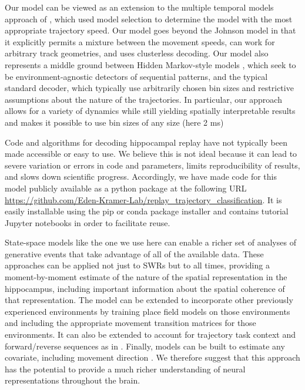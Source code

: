 \documentclass[9pt,lineno]{elife}
\begin{document}
Our model can be viewed as an extension to the multiple temporal models approach of \cite{JohnsonMeasuringdistributedproperties2008}, which used model selection to determine the model with the most appropriate trajectory speed. Our model goes beyond the Johnson model in that it explicitly permits a mixture between the movement speeds, can work for arbitrary track geometries, and uses clusterless decoding. Our model also represents a middle ground between Hidden Markov-style models \citep{MaboudiUncoveringtemporalstructure2018, ChenBayesiannonparametricmethods2016, LindermanBayesiannonparametricapproach2016, ChenUncoveringspatialtopology2012}, which seek to be environment-agnostic detectors of sequential patterns, and the typical standard decoder, which typically use arbitrarily chosen bin sizes and restrictive assumptions about the nature of the trajectories. In particular, our approach allows for a variety of dynamics while still yielding spatially interpretable results and makes it possible to use bin sizes of any size (here 2 ms)

Code and algorithms for decoding hippocampal replay have not typically been made accessible or easy to use. We believe this is not ideal because it can lead to severe variation or errors in code and parameters, limits reproducibility of results, and slows down scientific progress. Accordingly, we have made code for this model publicly available as a python package at the following URL \url{https://github.com/Eden-Kramer-Lab/replay_trajectory_classification}. It is easily installable using the pip or conda package installer and contains tutorial Jupyter notebooks in order to facilitate reuse.

State-space models like the one we use here can enable a richer set of analyses of generative events that take advantage of all of the available data. These approaches can be applied not just to SWRs but to all times, providing a moment-by-moment estimate of the nature of the spatial representation in the hippocampus, including important information about the spatial coherence of that representation. The model can be extended to incorporate other previously experienced environments by training place field models on those environments and including the appropriate movement transition matrices for those environments. It can also be extended to account for trajectory task context and forward/reverse sequences as in \cite{DengRapidclassificationhippocampal2016}. Finally, models can be built to estimate any covariate, including movement direction \citep{KayConstantSubsecondCycling2020}. We therefore suggest that this approach has the potential to provide a much richer understanding of neural representations throughout the brain. 
\end{document}
